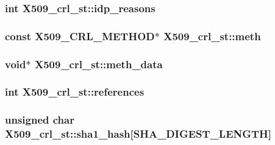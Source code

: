 \subsubsection[{\texorpdfstring{idp\+\_\+reasons}{idp_reasons}}]{\setlength{\rightskip}{0pt plus 5cm}int X509\+\_\+crl\+\_\+st\+::idp\+\_\+reasons}\hypertarget{struct_x509__crl__st_a1e5c7e949f238d6937a45ff6e57738b9}{}\label{struct_x509__crl__st_a1e5c7e949f238d6937a45ff6e57738b9}
\subsubsection[{\texorpdfstring{meth}{meth}}]{\setlength{\rightskip}{0pt plus 5cm}const {\bf X509\+\_\+\+C\+R\+L\+\_\+\+M\+E\+T\+H\+OD}$\ast$ X509\+\_\+crl\+\_\+st\+::meth}\hypertarget{struct_x509__crl__st_a7fbfb8e62320e2a6275153c832c2ccd5}{}\label{struct_x509__crl__st_a7fbfb8e62320e2a6275153c832c2ccd5}
\subsubsection[{\texorpdfstring{meth\+\_\+data}{meth_data}}]{\setlength{\rightskip}{0pt plus 5cm}void$\ast$ X509\+\_\+crl\+\_\+st\+::meth\+\_\+data}\hypertarget{struct_x509__crl__st_a409391d6ea1a661d0c27c84e26b9676b}{}\label{struct_x509__crl__st_a409391d6ea1a661d0c27c84e26b9676b}
\subsubsection[{\texorpdfstring{references}{references}}]{\setlength{\rightskip}{0pt plus 5cm}int X509\+\_\+crl\+\_\+st\+::references}\hypertarget{struct_x509__crl__st_aa143dabd3c77e3ef347835fc2f92b5a8}{}\label{struct_x509__crl__st_aa143dabd3c77e3ef347835fc2f92b5a8}
\subsubsection[{\texorpdfstring{sha1\+\_\+hash}{sha1_hash}}]{\setlength{\rightskip}{0pt plus 5cm}unsigned char X509\+\_\+crl\+\_\+st\+::sha1\+\_\+hash\mbox{[}{\bf S\+H\+A\+\_\+\+D\+I\+G\+E\+S\+T\+\_\+\+L\+E\+N\+G\+TH}\mbox{]}}\hypertarget{struct_x509__crl__st_a1040792ec929f92137cb677e58cc8e94}{}\label{struct_x509__crl__st_a1040792ec929f92137cb677e58cc8e94}
